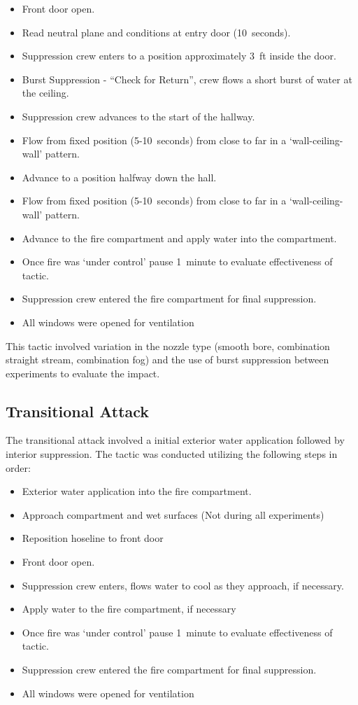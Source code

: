 \documentclass[12pt,oneside]{book}
\begin{document}
\begin{itemize}
	\item{Front door open.}
	\item{Read neutral plane and conditions at entry door (10~seconds).}
	\item{Suppression crew enters to a position approximately 3~ft inside the door.}
	\item{Burst Suppression - ``Check for Return'', crew flows a short burst of water at the ceiling.}
	\item{Suppression crew advances to the start of the hallway.}
	\item{Flow from fixed position (5-10~seconds) from close to far in a `wall-ceiling-wall' pattern.}
	\item{Advance to a position halfway down the hall.}
	\item{Flow from fixed position (5-10~seconds) from close to far in a `wall-ceiling-wall' pattern.}
	\item{Advance to the fire compartment and apply water into the compartment.}
	\item{Once fire was `under control' pause 1~minute to evaluate effectiveness of tactic.}
	\item{Suppression crew entered the fire compartment for final suppression.}
	\item{All windows were opened for ventilation}
\end{itemize}

This tactic involved variation in the nozzle type (smooth bore, combination straight stream, combination fog) and the use of burst suppression between experiments to evaluate the impact. 

\clearpage

\subsection{Transitional Attack}
The transitional attack involved a initial exterior water application followed by interior suppression. The tactic was conducted utilizing the following steps in order:

\begin{itemize}
	\item{Exterior water application into the fire compartment.}
	\item{Approach compartment and wet surfaces (Not during all experiments)}
	\item{Reposition hoseline to front door}
	\item{Front door open.}
	\item{Suppression crew enters, flows water to cool as they approach, if necessary.}
	\item{Apply water to the fire compartment, if necessary}
	\item{Once fire was `under control' pause 1~minute to evaluate effectiveness of tactic.}
	\item{Suppression crew entered the fire compartment for final suppression.}
	\item{All windows were opened for ventilation}
\end{itemize}
\end{document}
